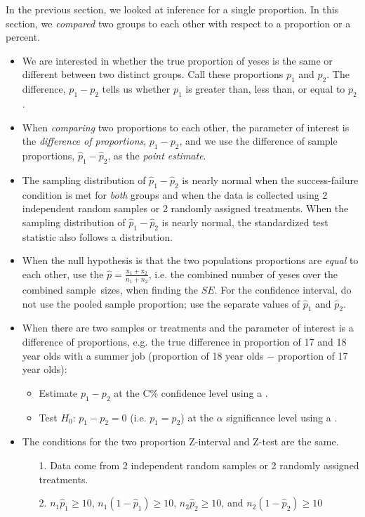 \noindent In the previous section, we looked at inference for a single proportion.  In this section, we \emph{compared} two groups to each other with respect to a proportion or a percent.
\begin{itemize} 
\item We are interested in whether the true proportion of yeses is the same or different between two distinct groups.  Call these proportions $p_1$ and $p_2$.  The difference, $p_1-p_2$ tells us whether $p_1$ is greater than, less than, or equal to $p_2$.  

\item When \emph{comparing} two proportions to each other, the parameter of interest is the \emph{difference of proportions}, $p_1-p_2$, and we use the difference of sample proportions, $\hat{p}_1-\hat{p}_2$, as the \emph{point estimate}.  

\item The sampling distribution of $\hat{p}_1-\hat{p}_2$ is nearly normal when the success-failure condition is met for \textit{both} groups and when the data is collected using 2 independent random samples or 2 randomly assigned treatments.  When the sampling distribution of $\hat{p}_1-\hat{p}_2$ is nearly normal, the standardized test statistic also follows a  distribution.

\item When the null hypothesis is that the two populations proportions are \textit{equal} to each other, use the  $\hat{p}=\frac{\text{x}_1+\text{x}_2}{n_1+n_2}$, i.e. the combined number of yeses over the combined sample~sizes, when finding the $SE$.  For the confidence interval, do not use the pooled sample proportion; use the separate values of  $\hat{p}_1$ and $\hat{p}_2$.  
\item When there are two samples or treatments and the parameter of interest is a difference of proportions, e.g. the true difference in proportion of 17 and 18 year olds with a summer job (proportion of 18 year olds $-$ proportion of 17 year olds): 
\begin{itemize}
\setlength{\itemsep}{0mm}
\item Estimate $p_1-p_2$ at the C\% confidence level using a .
\item Test $H_0$: $p_1-p_2=0$ (i.e. $p_1=p_2$) at the $\alpha$ significance level using a .
\end{itemize}
\item The conditions for the two proportion Z-interval and Z-test are the same.  \vspace{-1mm}
\begin{itemize}
\item[1.] Data come from 2 independent random samples or 2 randomly assigned treatments.
\item[2.] $n_1\hat{p}_1\ge 10$, $n_1(1-\hat{p}_1)\ge 10$, $n_2\hat{p}_2\ge 10$, and $n_2(1-\hat{p}_2)\ge 10$ 
\end{itemize}


\end{itemize}
